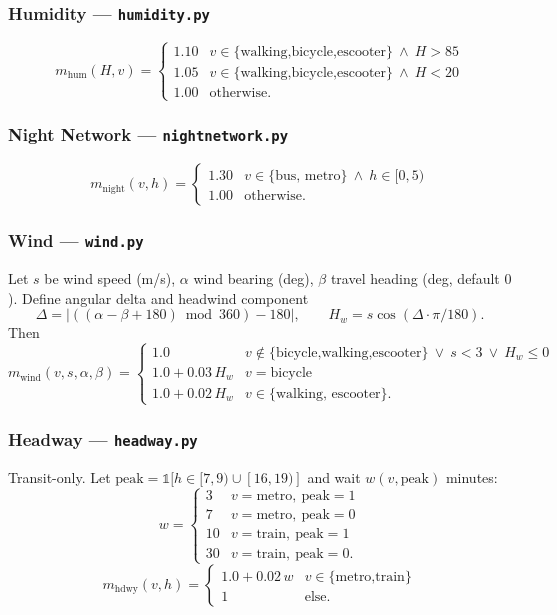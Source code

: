 \documentclass[12pt,a4paper]{article}
\begin{document}
\subsubsection{Humidity — \texttt{humidity.py}}
\[
m_{\text{hum}}(H,v) =
\begin{cases}
1.10 & v\in\{\text{walking,bicycle,escooter}\}\ \land\ H>85 \\
1.05 & v\in\{\text{walking,bicycle,escooter}\}\ \land\ H<20 \\
1.00 & \text{otherwise.}
\end{cases}
\]

\subsubsection{Night Network — \texttt{nightnetwork.py}}
\[
m_{\text{night}}(v,h) =
\begin{cases}
1.30 & v\in\{\text{bus, metro}\}\ \land\ h\in[0,5) \\
1.00 & \text{otherwise.}
\end{cases}
\]

\subsubsection{Wind — \texttt{wind.py}}
Let $s$ be wind speed (m/s), $\alpha$ wind bearing (deg), $\beta$ travel heading (deg, default $0$). Define angular delta and headwind component
\[
\Delta = \bigl|((\alpha-\beta+180)\bmod 360) - 180\bigr|,\qquad H_w = s\cos(\Delta\cdot\pi/180).
\]
Then
\[
m_{\text{wind}}(v,s,\alpha,\beta) =
\begin{cases}
1.0 & v\notin\{\text{bicycle,walking,escooter}\}\ \lor\ s<3\ \lor\ H_w\le 0 \\
1.0 + 0.03\,H_w & v=\text{bicycle} \\
1.0 + 0.02\,H_w & v\in\{\text{walking, escooter}\}.
\end{cases}
\]

\subsubsection{Headway — \texttt{headway.py}}
Transit-only. Let $\text{peak}=\mathbb{1}[h\in[7,9)\cup[16,19)]$ and wait $w(v,\text{peak})$ minutes:
\[
w = \begin{cases}
3 & v=\text{metro},\ \text{peak}=1 \\
7 & v=\text{metro},\ \text{peak}=0 \\
10 & v=\text{train},\ \text{peak}=1 \\
30 & v=\text{train},\ \text{peak}=0.
\end{cases}
\]
\[
m_{\text{hdwy}}(v,h) = \begin{cases} 1.0 + 0.02\,w & v\in\{\text{metro,train}\} \\ 1 & \text{else.} \end{cases}
\]
\end{document}

